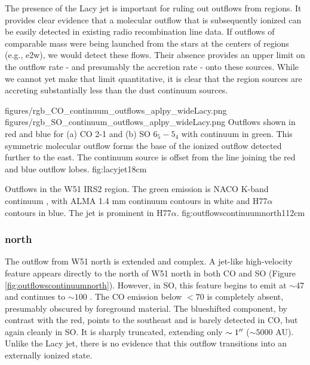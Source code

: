 \documentclass{aa}
\begin{document}
The presence of the Lacy jet is important for ruling out outflows from \hii
regions.  It provides clear evidence that a molecular outflow that is
subsequently ionized can be easily detected in existing radio recombination
line data.  If outflows of comparable mass were being launched from the stars
at the centers of \hchii regions (e.g., e2w), we would detect these flows.
Their absence provides an upper limit on the outflow rate - and presumably the
accretion rate - onto these sources.  While we cannot yet make that limit
quantitative, it is clear that the \hchii region sources are accreting
substantially less than the dust continuum sources.



\FigureTwo
{figures/rgb_CO_continuum_outflows_aplpy_wideLacy.png}
{figures/rgb_SO_continuum_outflows_aplpy_wideLacy.png}
{Outflows shown in red and blue for (a) CO 2-1 and (b) SO $6_5-5_4$ with
continuum in green.  This symmetric molecular outflow forms the base of the
\citet{Lacy2007a} ionized outflow detected further to the east.
The continuum source is offset from the line joining the red and blue outflow lobes.}
{fig:lacyjet}{1}{8cm}


{Outflows in the W51 IRS2 region.  The green emission is NACO K-band continuum
\citep{Barbosa2008a}, with ALMA 1.4 mm continuum contours in white and
H77$\alpha$ contours in blue.  The \citet{Lacy2007a} jet is prominent in
H77$\alpha$.}
{fig:outflowscontinuumnorth}{1}{12cm}

\subsubsection{north}
The outflow from W51 north is extended and complex.
A jet-like high-velocity feature appears directly to the north of W51 north in
both CO and SO (Figure \ref{fig:outflowscontinuumnorth}).  However, in SO, this feature begins to emit at $\sim47$ \kms
and continues to $\sim 100$ \kms.  The CO emission below $<70$ \kms is
completely absent, presumably obscured by foreground material.  The blueshifted
component, by contrast with the red, points to the southeast and is barely
detected in CO, but again cleanly in SO.  It is sharply truncated, extending
only $\sim1 \mbox{$^{\prime\prime}$}$ ($\sim5000$ AU).  Unlike the Lacy jet, there is no
evidence that this outflow transitions into an externally ionized state.
\end{document}
